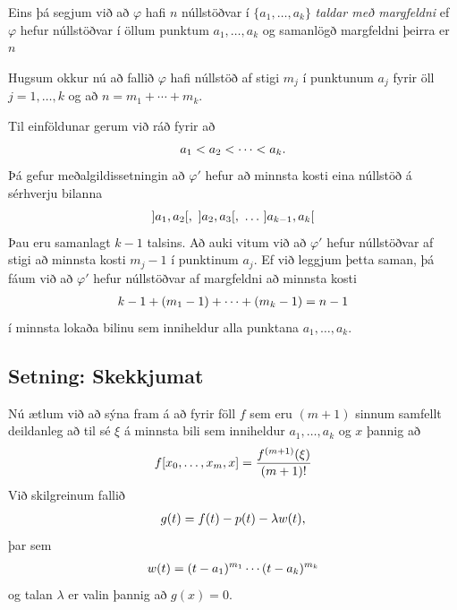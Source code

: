 \documentclass[A4paper,10pt,icelandic]{sphinxmanual}
\begin{document}
Eins þá segjum við að \(\varphi\) hafi \(n\) núllstöðvar í
\(\{a_1,\dots,a_k\}\) \emph{taldar með margfeldni} ef \(\varphi\)
hefur núllstöðvar í öllum punktum \(a_1,\dots,a_k\) og samanlögð
margfeldni þeirra er \(n\)

Hugsum okkur nú að fallið \(\varphi\) hafi núllstöð af stigi
\(m_j\) í punktunum \(a_j\) fyrir öll \(j=1,\dots,k\) og að
\(n=m_1+\cdots+m_k\).

Til einföldunar gerum við ráð fyrir að
\begin{gather}
\begin{split}a_1<a_2<\cdots<a_k.\end{split}\notag
\end{gather}
Þá gefur meðalgildissetningin að \(\varphi'\) hefur að minnsta kosti
eina núllstöð á sérhverju bilanna
\begin{gather}
\begin{split}]a_1,a_2[, \  ]a_2,a_3[, \ \dots \  ]a_{k-1},a_k[\end{split}\notag
\end{gather}
Þau eru samanlagt \(k-1\) talsins. Að auki vitum við að
\(\varphi'\) hefur núllstöðvar af stigi að minnsta kosti
\(m_j-1\) í punktinum \(a_j\). Ef við leggjum þetta saman, þá
fáum við að \(\varphi'\) hefur núllstöðvar af margfeldni að minnsta
kosti
\begin{gather}
\begin{split}k-1+(m_1-1)+\cdots+(m_k-1)=n-1\end{split}\notag
\end{gather}
í minnsta lokaða bilinu sem inniheldur alla punktana
\(a_1,\dots,a_k\).


\subsection{Setning: Skekkjumat}
\label{kafli03:setning-skekkjumat}
Nú ætlum við að sýna fram á að fyrir föll \(f\) sem eru
\((m+1)\) sinnum samfellt deildanleg að til sé \(\xi\) á minnsta
bili sem inniheldur \(a_1, \ldots, a_k\) og \(x\) þannig að
\begin{gather}
\begin{split}f[x_0,\ldots,x_m,x] = \frac{f^{(m+1)}(\xi)}{(m+1)!}\end{split}\notag
\end{gather}
Við skilgreinum fallið
\begin{gather}
\begin{split}g(t) = f(t) - p(t) - \lambda w(t),\end{split}\notag
\end{gather}
þar sem
\begin{gather}
\begin{split}w(t) = (t-a_1)^{m_1} \cdots (t-a_k)^{m_k}\end{split}\notag
\end{gather}
og talan \(\lambda\) er valin þannig að \(g(x) = 0\).
\end{document}
